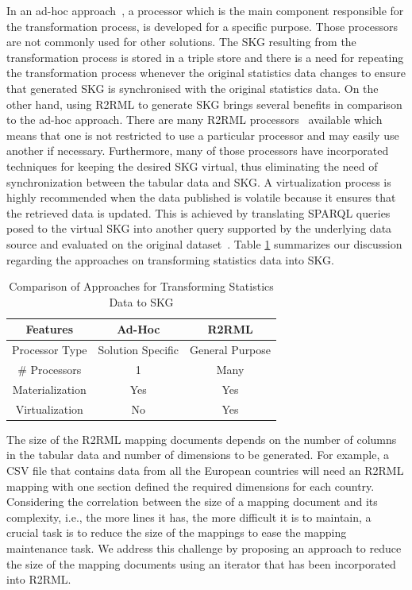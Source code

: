 In an ad-hoc approach~\citep{corcho2017publishing}, a processor which is the main component responsible for the transformation process, is developed for a specific purpose. Those processors are not commonly used for other solutions. The SKG resulting from the transformation process is stored in a triple store and there is a need for repeating the transformation process whenever the original statistics data changes to ensure that generated SKG is synchronised with the original statistics data. On the other hand, using R2RML to generate SKG brings several benefits in comparison to the ad-hoc approach. There are many R2RML processors~\citep{priyatna2014formalisation,calvanese2017ontop} available which means that one is not restricted to use a particular processor and may easily use another if necessary. Furthermore, many of those processors have incorporated techniques for keeping the desired SKG virtual, thus eliminating the need of synchronization between the tabular data and SKG. A virtualization process is highly recommended when the data published is volatile because it ensures that the retrieved data is updated. This is achieved by translating SPARQL queries posed to the virtual SKG into another query supported by the underlying data source and evaluated on the original dataset~\citep{poggi2008linking}. Table \ref{table:chapter4_compare} summarizes our discussion regarding the approaches on transforming statistics data into SKG.

\begin{table}[tbp]
\caption[Transforming approaches for SKG]{Comparison of Approaches for Transforming Statistics Data to SKG}
\label{table:chapter4_compare}
\begin{tabular}{c|c|c}
\hline
\textbf{Features} & \textbf{Ad-Hoc}   & \textbf{R2RML}  \\ \hline
Processor Type    & Solution Specific & General Purpose \\ 
\# Processors     & 1                 & Many            \\
Materialization   & Yes               & Yes             \\ 
Virtualization    & No                & Yes             \\ \hline
\end{tabular}
\end{table}

The size of the R2RML mapping documents depends on the number of columns in the tabular data and number of dimensions to be generated. For example, a CSV file that contains data from all the European countries will need an R2RML mapping with one section defined the required dimensions for each country. Considering the correlation between the size of a mapping document and its complexity, i.e., the more lines it has, the more difficult it is to maintain, a crucial task is to reduce the size of the mappings to ease the mapping maintenance task. We address this challenge by proposing an approach to reduce the size of the mapping documents using an iterator that has been incorporated into R2RML.


